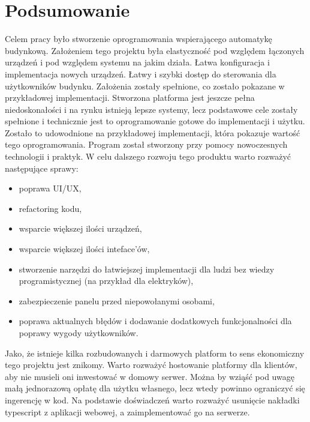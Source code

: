 \chapter{Podsumowanie}
\label{chap:podsumowanie}
Celem pracy było stworzenie oprogramowania wspierającego automatykę budynkową. Założeniem tego projektu była elastyczność pod względem łączonych urządzeń i pod względem systemu na jakim działa. 
Łatwa konfiguracja i implementacja nowych urządzeń.
Łatwy i szybki dostęp do sterowania dla użytkowników budynku.
Założenia zostały spełnione, co zostało pokazane w przykładowej implementacji.
\newline
Stworzona platforma jest jeszcze pełna niedoskonałości i na rynku istnieją lepsze systemy, lecz podstawowe cele zostały spełnione i technicznie jest to oprogramowanie gotowe do implementacji i użytku. Zostało to udowodnione na przykładowej implementacji, która pokazuje wartość tego oprogramowania. Program został stworzony przy pomocy nowoczesnych technologii i praktyk. W celu dalszego rozwoju tego produktu warto rozważyć następujące sprawy:
\begin{itemize}
    \item poprawa UI/UX,
    \item refactoring kodu,
    \item wsparcie większej ilości urządzeń,
    \item wsparcie większej ilości inteface'ów,
    \item stworzenie narzędzi do łatwiejszej implementacji dla ludzi bez wiedzy programistycznej (na przykład dla elektryków),
    \item zabezpieczenie panelu przed niepowołanymi osobami,
    \item poprawa aktualnych błędów i dodawanie dodatkowych funkcjonalności dla poprawy wygody użytkowników.
\end{itemize}
Jako, że istnieje kilka rozbudowanych i darmowych platform to sens ekonomiczny tego projektu jest znikomy. Warto rozważyć hostowanie platformy dla klientów, aby nie musieli oni inwestować w domowy serwer. Można by wziąść pod uwagę małą jednorazową opłatę dla użytku własnego, lecz wtedy powinno ograniczyć się ingerencję w kod. Na podstawie doświadczeń warto rozważyć usunięcie nakładki typescript z aplikacji webowej, a zaimplementować go na serwerze. 